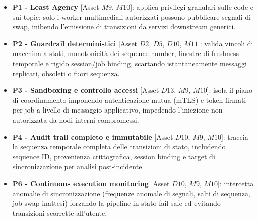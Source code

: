 \documentclass[11pt,a4paper]{article}
\begin{document}
\begin{itemize}
    \item \textbf{P1 - Least Agency} [Asset $M9$, $M10$]:
    applica privilegi granulari sulle code e sui topic; solo i worker multimediali autorizzati possono pubblicare segnali di swap, inibendo l'emissione di transizioni da servizi downstream generici.

    \item \textbf{P2 - Guardrail deterministici} [Asset $D2$, $D5$, $D10$, $M11$]:
    valida vincoli di macchina a stati, monotonicità dei sequence number, finestre di freshness temporale e rigido session/job binding, scartando istantaneamente messaggi replicati, obsoleti o fuori sequenza.

    \item \textbf{P3 - Sandboxing e controllo accessi} [Asset $D13$, $M9$, $M10$]:
    isola il piano di coordinamento imponendo autenticazione mutua (mTLS) e token firmati per-job a livello di messaggio applicativo, impedendo l'iniezione non autorizzata da nodi interni compromessi.

    \item \textbf{P4 - Audit trail completo e immutabile} [Asset $D10$, $M9$, $M10$]:
    traccia la sequenza temporale completa delle transizioni di stato, includendo sequence ID, provenienza crittografica, session binding e target di sincronizzazione per analisi post-incidente.

    \item \textbf{P6 - Continuous execution monitoring} [Asset $D10$, $M9$, $M10$]:
    intercetta anomalie di sincronizzazione (frequenze anomale di segnali, salti di sequenza, job swap inattesi) forzando la pipeline in stato fail-safe ed evitando transizioni scorrette all'utente.


\end{itemize}
\end{document}
